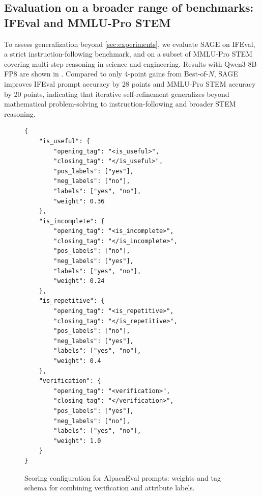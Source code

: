 \documentclass[11pt]{article}
\theoremstyle{plain}
\theoremstyle{definition}
\theoremstyle{remark}
\newcommand{\method}{SAGE}
\begin{document}
\subsection{Evaluation on a broader range of benchmarks: IFEval and MMLU-Pro STEM}


To assess generalization beyond \cref{sec:experiments}, we evaluate \method{} on IFEval, a strict instruction-following benchmark, and on a subset of MMLU-Pro STEM covering multi-step reasoning in science and engineering. Results with Qwen3-8B-FP8 are shown in . Compared to only 4-point gains from Best-of-\(N\), \method{} improves IFEval prompt accuracy by 28 points and MMLU-Pro STEM accuracy by 20 points, indicating that iterative self-refinement generalizes beyond mathematical problem-solving to instruction-following and broader STEM reasoning.

\endgroup

\begin{figure}[h]
\centering
\begin{minipage}{\linewidth}
\begin{small}
\begin{verbatim}
{
    "is_useful": {
        "opening_tag": "<is_useful>",
        "closing_tag": "</is_useful>",
        "pos_labels": ["yes"],
        "neg_labels": ["no"],
        "labels": ["yes", "no"],
        "weight": 0.36
    },
    "is_incomplete": {
        "opening_tag": "<is_incomplete>",
        "closing_tag": "</is_incomplete>",
        "pos_labels": ["no"],
        "neg_labels": ["yes"],
        "labels": ["yes", "no"],
        "weight": 0.24
    },
    "is_repetitive": {
        "opening_tag": "<is_repetitive>",
        "closing_tag": "</is_repetitive>",
        "pos_labels": ["no"],
        "neg_labels": ["yes"],
        "labels": ["yes", "no"],
        "weight": 0.4
    },
    "verification": {
        "opening_tag": "<verification>",
        "closing_tag": "</verification>",
        "pos_labels": ["yes"],
        "neg_labels": ["no"],
        "labels": ["yes", "no"],
        "weight": 1.0
    }
}
\end{verbatim}
\end{small}
\end{minipage}
\caption{Scoring configuration for AlpacaEval prompts: weights and tag schema for combining verification and attribute labels.}
\label{fig:appendix-qwen-alpaca-config}
\end{figure}
\end{document}
